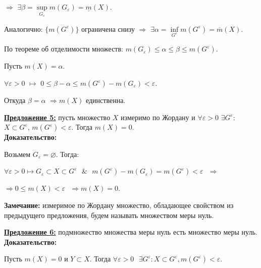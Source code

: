 \documentclass[a4paper,12pt]{article} %
\begin{document}
$\Rightarrow$ $\exists \beta = \sup\limits_{G_{\varepsilon}} m(G_{\varepsilon}) = \underline{m}(X)$.

Аналогично: $\{m(G^{\varepsilon})\}$ ограничена снизу $\Rightarrow$ $\exists \alpha = \inf\limits_{G^{\varepsilon}} m(G^{\varepsilon}) = \overline{m}(X)$.

\vspace{3mm}

По теореме об отделимости множеств: $m(G_{\varepsilon}) \leqslant \alpha \leqslant \beta \leqslant m(G^{\varepsilon})$.

\vspace{3mm}
Пусть $m(X) = \alpha$.

$\forall \varepsilon > 0$ $\longmapsto$ $0 \leqslant \beta - \alpha \leqslant m(G^{\varepsilon}) - m(G_{\varepsilon}) < \varepsilon$.

Откуда $\beta = \alpha$ $\Rightarrow m(X)$ единственна. 


\vspace{3mm}

\underline{\textbf{Предложение 5:}} пусть множество $X$ измеримо по Жордану и $\forall \varepsilon > 0$ $\exists G^{\varepsilon}$: $X \subset G^{\varepsilon}$, $m(G^{\varepsilon}) < \varepsilon$. Тогда $m(X) = 0$.\\

\textbf{Доказательство:} 

Возьмем $G_{\varepsilon} = \varnothing$. Тогда:

$\forall \varepsilon > 0 \longmapsto G_{\varepsilon} \subset X \subset G^{\varepsilon} \text{ } \& \text{ } m(G^{\varepsilon}) - m(G_{\varepsilon}) = m(G^{\varepsilon}) < \varepsilon \text{ } \Rightarrow$ 

$\Rightarrow 0 \leqslant m(X) < \varepsilon \text{ } \Rightarrow m(X) = 0$.

\vspace{3mm}

\textbf{Замечание:} измеримое по Жордану множество, обладающее свойством из предыдущего предложения, будем называть множеством меры нуль.

\vspace{3mm}

\underline{\textbf{Предложение 6:}} подмножество множества меры нуль есть множество меры нуль.\\

\textbf{Доказательство:}
 
Пусть $m(X) = 0$ и $Y \subset X$. Тогда $\forall \varepsilon > 0 \text{ }\exists G^{\varepsilon}: X \subset G^{\varepsilon}, m(G^{\varepsilon}) < \varepsilon$.
\end{document}
